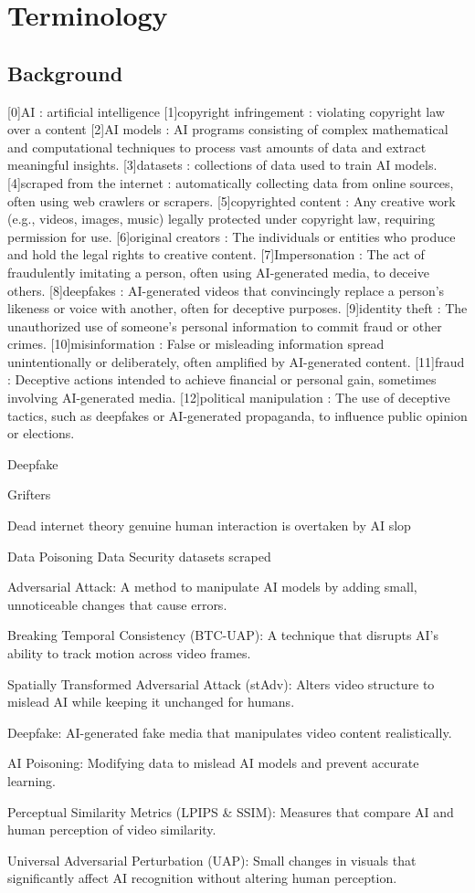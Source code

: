 \section{Terminology}
\label{section:terminology}

\subsection{Background}
\label{subsection:Background}
[0]AI : artificial intelligence
[1]copyright infringement : violating copyright law over a content
[2]AI models : AI programs consisting of complex mathematical and computational techniques to process vast amounts of data and extract meaningful insights.
[3]datasets : collections of data used to train AI models.
[4]scraped from the internet : automatically collecting data from online sources, often using web crawlers or scrapers.
[5]copyrighted content : Any creative work (e.g., videos, images, music) legally protected under copyright law, requiring permission for use.
[6]original creators : The individuals or entities who produce and hold the legal rights to creative content.
[7]Impersonation : The act of fraudulently imitating a person, often using AI-generated media, to deceive others.
[8]deepfakes : AI-generated videos that convincingly replace a person’s likeness or voice with another, often for deceptive purposes.
[9]identity theft : The unauthorized use of someone’s personal information to commit fraud or other crimes.
[10]misinformation : False or misleading information spread unintentionally or deliberately, often amplified by AI-generated content.
[11]fraud : Deceptive actions intended to achieve financial or personal gain, sometimes involving AI-generated media.
[12]political manipulation : The use of deceptive tactics, such as deepfakes or AI-generated propaganda, to influence public opinion or elections.

Deepfake

Grifters

Dead internet theory
    genuine human interaction is overtaken by AI slop

Data Poisoning
Data Security
datasets
scraped

Adversarial Attack: A method to manipulate AI models by adding small, unnoticeable changes that cause errors.

Breaking Temporal Consistency (BTC-UAP): A technique that disrupts AI’s ability to track motion across video frames.

Spatially Transformed Adversarial Attack (stAdv): Alters video structure to mislead AI while keeping it unchanged for humans.

Deepfake: AI-generated fake media that manipulates video content realistically.

AI Poisoning: Modifying data to mislead AI models and prevent accurate learning.

Perceptual Similarity Metrics (LPIPS \& SSIM): Measures that compare AI and human perception of video similarity.

Universal Adversarial Perturbation (UAP): Small changes in visuals that significantly affect AI recognition without altering human perception.
